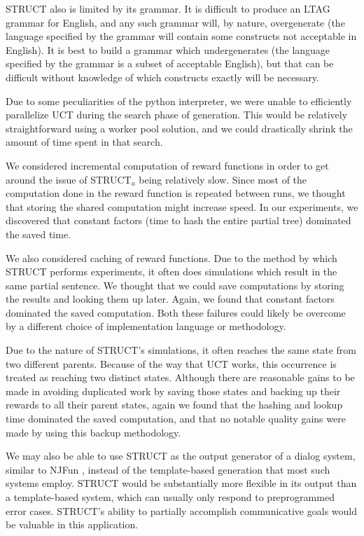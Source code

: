 STRUCT also is limited by its grammar.  It is difficult to produce an LTAG grammar
for English, and any such grammar will, by nature, overgenerate (the language
specified by the grammar will contain some constructs not acceptable in
English).  It is best to build a grammar which undergenerates (the language
specified by the grammar is a subset of acceptable English), but that can
be difficult without knowledge of which constructs exactly will be necessary.

Due to some peculiarities of the python interpreter, we were unable to
efficiently parallelize UCT during the search phase of generation.  This
would be relatively straightforward using a worker pool solution, and we
could drastically shrink the amount of time spent in that search.

We considered incremental computation of reward functions in order
to get around the issue of STRUCT$_a$ being relatively slow.  Since most
of the computation done in the reward function is repeated between runs,
we thought that storing the shared computation might increase speed.  In
our experiments, we discovered that constant factors (time to hash the entire
partial tree) dominated the saved time.

We also considered caching of reward functions.  Due to the method by
which STRUCT performs experiments, it often does simulations which result
in the same partial sentence.  We thought that we could save computations
by storing the results and looking them up later.  Again, we found that
constant factors dominated the saved computation.  Both these failures could
likely be overcome by a different choice of implementation language or
methodology.

Due to the nature of STRUCT's simulations, it often reaches the same state
from two different parents.  Because of the way that UCT works, this occurrence is
treated as reaching two distinct states.  Although there are reasonable gains to be
made in avoiding duplicated work by saving those states and backing up their rewards to
all their parent states, again we found that the
hashing and lookup time dominated the saved computation, and that no notable quality
gains were made by using this backup methodology.

We may also be able to use STRUCT as the output generator of a dialog system,
similar to NJFun \cite{litman_njfun_2000}, instead of the template-based generation
that most such systems employ.  STRUCT would be substantially more flexible in
its output than a template-based system, which can usually only respond to preprogrammed
error cases.  STRUCT's ability to partially accomplish communicative goals would be
valuable in this application.

